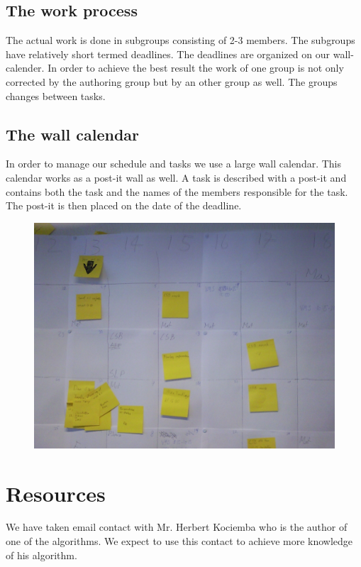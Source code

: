 \documentclass{article}
\begin{document}
\subsection{The work process}
The actual work is done in subgroups consisting of 2-3 members.  The subgroups have relatively short termed deadlines. The deadlines are organized on our wall-calender. In order to achieve the best result the work of one group is not only corrected by the authoring group but by an other group as well. The groups changes between tasks. 

\subsection{The wall calendar}
In order to manage our schedule and tasks we use a large wall calendar. This calendar works as a post-it wall as well. A task is described with a post-it and contains both the task and the names of the members responsible for the task. The post-it is then placed on the date of the deadline.
\begin{figure}[hp]
	\centering
		\includegraphics[scale = 0.1]{Billede0075.jpg}
		
		\label{fig:wall}
\end{figure}


\section{Resources}
We have taken email contact with Mr. Herbert Kociemba who is the author of one of the algorithms. We expect to use this contact to achieve more knowledge of his algorithm.
\end{document}
